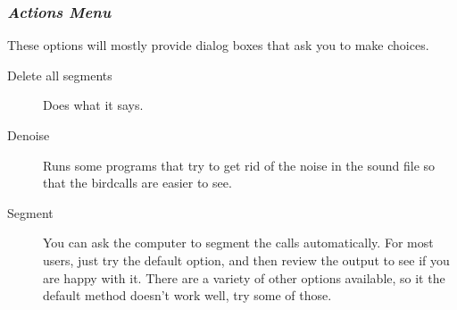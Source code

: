 \documentclass{article}
\begin{document}
\subsubsection{{\em Actions Menu}}
\label{sec:action}

These options will mostly provide dialog boxes that ask you to make choices. 

\begin{description}
\item [Delete all segments] Does what it says. 
\item [Denoise] Runs some programs that try to get rid of the noise in the sound file so that the birdcalls are easier to see. 
\item [Segment] You can ask the computer to segment the calls automatically. 
For most users, just try the default option, and then review the output to see if you are happy with it. There are a variety of other options available, so it the default method doesn't work well, try some of those. 
 

\end{description}
\end{document}
